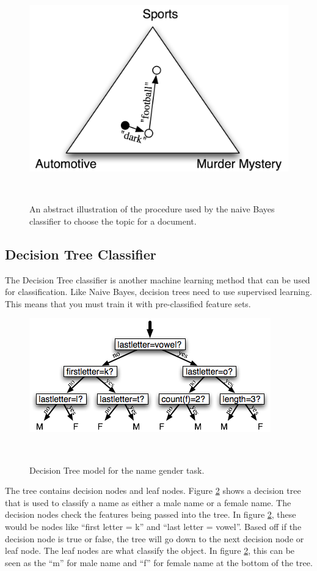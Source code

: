  \begin{figure}
\centering
\includegraphics{figures/naive-bayes-triangle}
  \caption{An abstract illustration of the procedure used by the naive Bayes classifier to choose the topic for a document.\cite{NLTK}}~\label{fig:bayes}
\end{figure}


\subsection{Decision Tree Classifier}
The Decision Tree classifier is another machine learning method that can be used for classification. Like Naive Bayes, decision trees need to use supervised learning. This means that you must train it with pre-classified feature sets. \cite{NLTK}

 \begin{figure}
\centering
\includegraphics{figures/decision-tree}
  \caption{Decision Tree model for the name gender task.\cite{NLTK}}~\label{fig:dtree}
\end{figure}

The tree contains decision nodes and leaf nodes. Figure \ref{fig:dtree} shows a decision tree that is used to classify a name as either a male name or a female name. The decision nodes check the features being passed into the tree. In figure \ref{fig:dtree}, these would be nodes like ``first letter = k'' and ``last letter = vowel''. Based off if the decision node is true or false, the tree will go down to the next decision node or leaf node. The leaf nodes are what classify the object. In figure \ref{fig:dtree}, this can be seen as the ``m'' for male name and ``f'' for female name at the bottom of the tree. \cite{NLTK}

